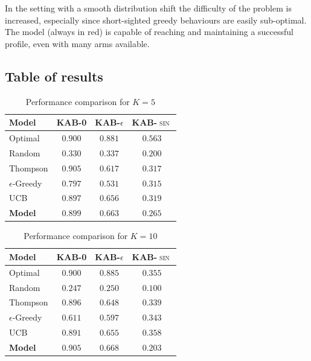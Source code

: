 \noindent In the setting with a smooth distribution shift the difficulty of the problem is increased, especially since short-sighted greedy behaviours are easily sub-optimal. The model (always in red) is capable of reaching and maintaining a successful profile, even with many arms available.


\subsection{Table of results}

\begin{table}[H]
\centering
\caption{Performance comparison for $K=5$}
\label{tab:k5}
\begin{tabular}{l c c c}
\toprule
\textbf{Model} & \textbf{\textsc{KAB-0}} & \textbf{\textsc{KAB-$\epsilon$}} & \textbf{\textsc{KAB-$\sin$}}\\
\midrule
Optimal & $0.900$ & $0.881$ & $0.563$ \\
Random & $0.330$ & $0.337$ & $0.200$ \\
\midrule
Thompson & $0.905$ & $0.617$ & $0.317$ \\
$\epsilon$-Greedy & $0.797$ & $0.531$ & $0.315$ \\
UCB & $0.897$ & $0.656$ & $0.319$ \\
\textbf{Model} & $\mathbf{0.899}$ & $\mathbf{0.663}$ & $\mathbf{0.265}$ \\

\bottomrule
\end{tabular}
\end{table}

\begin{table}[H]
\centering
\caption{Performance comparison for $K=10$}
\label{tab:k10}
\begin{tabular}{l c c c}
\toprule
\textbf{Model} & \textbf{\textsc{KAB-0}} & \textbf{\textsc{KAB-$\epsilon$}} & \textbf{\textsc{KAB-$\sin$}} \\
\midrule
Optimal & $0.900$ & $0.885$ & $0.355$  \\
Random & $0.247$ & $0.250$ & $0.100$ \\
\midrule
Thompson & $0.896$ & $0.648$ & $0.339$ \\

$\epsilon$-Greedy & $0.611$ & $0.597$ & $0.343$ \\
UCB & $0.891$ & $0.655$ & $0.358$ \\
\textbf{Model} & $\mathbf{0.905}$ & $\mathbf{0.668}$ & $\mathbf{0.203}$  \\
\bottomrule
\end{tabular}
\end{table}

